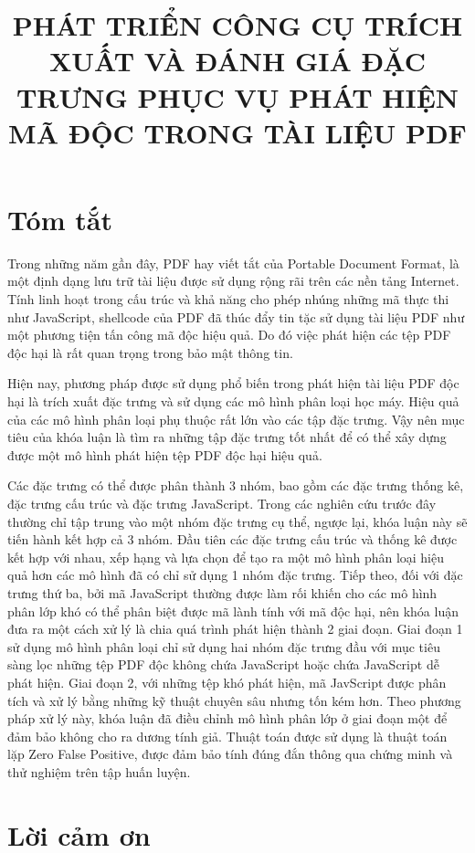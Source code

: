 \documentclass[12pt,a4paper]{report}
\title{PHÁT TRIỂN CÔNG CỤ TRÍCH XUẤT VÀ ĐÁNH GIÁ ĐẶC TRƯNG PHỤC VỤ PHÁT HIỆN MÃ ĐỘC TRONG TÀI LIỆU PDF}
\begin{document}

\clearpage{}

\chapter*{Tóm tắt}
Trong những năm gần đây, PDF hay viết tắt của Portable Document Format, là một định dạng lưu trữ tài liệu được sử dụng rộng rãi trên các nền tảng Internet. Tính linh hoạt trong cấu trúc và khả năng cho phép nhúng những mã thực thi như JavaScript, shellcode của PDF đã thúc đẩy tin tặc sử dụng tài liệu PDF như một phương tiện tấn công mã độc hiệu quả. Do đó việc phát hiện các tệp PDF độc hại là rất quan trọng trong bảo mật thông tin.

Hiện nay, phương pháp được sử dụng phổ biến trong phát hiện tài liệu PDF độc hại là trích xuất đặc trưng và sử dụng các mô hình phân loại học máy. Hiệu quả của các mô hình phân loại phụ thuộc rất lớn vào các tập đặc trưng. Vậy nên mục tiêu của khóa luận là tìm ra những tập đặc trưng tốt nhất để có thể xây dựng được một mô hình phát hiện tệp PDF độc hại hiệu quả.

Các đặc trưng có thể được phân thành 3 nhóm, bao gồm các đặc trưng thống kê, đặc trưng cấu trúc và đặc trưng JavaScript. Trong các nghiên cứu trước đây thường chỉ tập trung vào một nhóm đặc trưng cụ thể, ngược lại, khóa luận này sẽ tiến hành kết hợp cả 3 nhóm. Đầu tiên các đặc trưng cấu trúc và thống kê được kết hợp với nhau, xếp hạng và lựa chọn để tạo ra một mô hình phân loại hiệu quả hơn các mô hình đã có chỉ sử dụng 1 nhóm đặc trưng. Tiếp theo, đối với đặc trưng thứ ba, bởi mã JavaScript thường được làm rối khiến cho các mô hình phân lớp khó có thể phân biệt được mã lành tính với mã độc hại, nên khóa luận đưa ra một cách xử lý là chia quá trình phát hiện thành 2 giai đoạn. Giai đoạn 1 sử dụng mô hình phân loại chỉ sử dụng hai nhóm đặc trưng đầu với mục tiêu sàng lọc những tệp PDF độc không chứa JavaScript hoặc chứa JavaScript dễ phát hiện. Giai đoạn 2, với những tệp khó phát hiện, mã JavScript được phân tích và xử lý bằng những kỹ thuật chuyên sâu nhưng tốn kém hơn. Theo phương pháp xử lý này, khóa luận đã điều chỉnh mô hình phân lớp ở giai đoạn một để đảm bảo không cho ra dương tính giả. Thuật toán được sử dụng là thuật toán lặp Zero False Positive, được đảm bảo tính đúng đắn thông qua chứng minh và thử nghiệm trên tập huấn luyện.

\chapter*{Lời cảm ơn}
\end{document}
